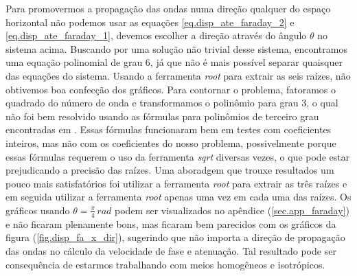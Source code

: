 Para promovermos a propaga\c{c}\~ao das ondas numa dire\c{c}\~ao qualquer do espa\c{c}o horizontal n\~ao podemos usar as equa\c{c}\~oes  \ref{eq.disp_ate_faraday_2} e \ref{eq.disp_ate_faraday_1}, devemos escolher a dire\c{c}\~ao atrav\'es do \^angulo $\theta$ no sistema acima. Buscando por uma solu\c{c}\~ao n\~ao trivial desse sistema, encontramos uma equa\c{c}\~ao polinomial de grau 6, j\'a que n\~ao \'e mais poss\'ivel separar quaisquer das equa\c{c}\~oes do sistema. Usando a ferramenta \textit{root} para extrair as seis ra\'izes, n\~ao obtivemos boa confec\c{c}\~ao dos gr\'aficos. Para contornar o problema, fatoramos o quadrado do n\'umero de onda e transformamos o polin\^omio para grau 3, o qual n\~ao foi bem resolvido usando as f\'ormulas para polin\^omios de terceiro grau encontradas em \cite{abramovitz_64}. Essas f\'ormulas funcionaram bem em testes com coeficientes inteiros, mas n\~ao com os coeficientes do nosso problema, possivelmente porque essas f\'ormulas requerem o uso da ferramenta \textit{sqrt} diversas vezes, o que pode estar prejudicando a precis\~ao das ra\'izes. Uma aboradgem que trouxe resultados um pouco mais satisfat\'orios foi utilizar a ferramenta \textit{root} para extrair as tr\^es ra\'izes e em seguida utilizar a ferramenta \textit{root} apenas uma vez em cada uma das ra\'izes. Os gr\'aficos usando $\theta=\frac{\pi}{4}\,rad$ podem ser visualizados no ap\^endice (\ref{sec.app_faraday}) e n\~ao ficaram plenamente bons, mas ficaram bem parecidos com os gr\'aficos da figura (\ref{fig.disp_fa_x_dir}), sugerindo que n\~ao importa a dire\c{c}\~ao de propaga\c{c}\~ao das ondas no c\'alculo da velocidade de fase e atenua\c{c}\~ao. Tal resultado pode ser consequ\^encia de estarmos trabalhando com meios homog\^eneos e isotr\'opicos.

